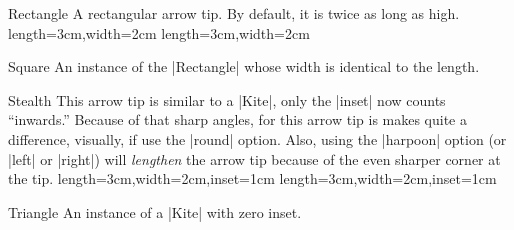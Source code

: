 \begin{arrowtip}{Rectangle}
  {
    A rectangular arrow tip. By default, it is twice as long as high. 
  }
  {length=3cm,width=2cm}
  {length=3cm,width=2cm}
  
  \begin{arrowexamples}
    \arrowexample[]
    \arrowexampledup[sep]
    \arrowexampledupdot[sep]
    \arrowexample[open]
    \arrowexample[length=4pt]
    \arrowexample[round]
    \arrowexample[slant=.3]
    \arrowexample[left]
    \arrowexample[right]
    \arrowexample[red]
  \end{arrowexamples}
\end{arrowtip}


\begin{arrowtipsimple}{Square}
  An instance of the |Rectangle| whose width is identical to the length.
  
  \begin{arrowexamples}
    \arrowexample[]
    \arrowexampledup[sep]
    \arrowexampledupdot[sep]
    \arrowexample[open]
    \arrowexample[length=4pt]
    \arrowexample[round]
    \arrowexample[slant=.3]
    \arrowexample[left]
    \arrowexample[right]
    \arrowexample[red]
  \end{arrowexamples}
\end{arrowtipsimple}



\begin{arrowtip}{Stealth}
  {
    This arrow tip is similar to a |Kite|, only the |inset| now counts
    ``inwards.'' Because of that sharp angles, for this arrow tip is
    makes quite a difference, visually, if use the |round|
    option. Also, using the |harpoon| option (or |left| or |right|)
    will \emph{lengthen} the arrow tip because of the even sharper
    corner at the tip.
  }
  {length=3cm,width=2cm,inset=1cm}
  {length=3cm,width=2cm,inset=1cm}
  
  \begin{arrowexamples}
    \arrowexample[]
    \arrowexampledup[sep]
    \arrowexampledupdot[sep]
    \arrowexample[open]
    \arrowexample[length=6pt,width=4pt]
    \arrowexample[length=6pt,width=4pt,inset=1.5pt]
    \arrowexample[round]
    \arrowexample[slant=.3]
    \arrowexample[left]
    \arrowexample[right]
    \arrowexample[red]
  \end{arrowexamples}
\end{arrowtip}


\begin{arrowtipsimple}{Triangle}
  An instance of a |Kite| with zero inset.
  
  \begin{arrowexamples}
    \arrowexample[]
    \arrowexampledup[sep]
    \arrowexampledupdot[sep]
    \arrowexample[open]
    \arrowexample[length=4pt]
    \arrowexample[angle=45:1pt 3]
    \arrowexample[angle=60:1pt 3]
    \arrowexample[angle=90:1pt 3]
    \arrowexample[round]
    \arrowexample[slant=.3]
    \arrowexample[left]
    \arrowexample[right]
    \arrowexample[red]
  \end{arrowexamples}
\end{arrowtipsimple}

